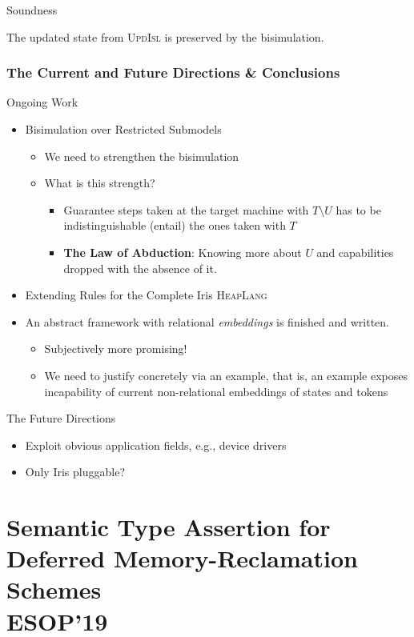 \documentclass[aspectratio=169,xcolor=dvipsnames]{beamer}
\newcommand{\makepart}[1]{ %
\part{#1} \frame{\partpage}
}
\begin{document}
\begin{frame}{Soundness}
\begin{theorem}[Soundness]
    The updated state from \textsc{UpdIsl} is preserved by the bisimulation.
\end{theorem}
\end{frame}


\section{The Current and Future Directions \& Conclusions}
\begin{frame}{Ongoing Work}
    \begin{itemize}
        \item Bisimulation over Restricted Submodels
        \begin{itemize}
            \item We need to  strengthen the bisimulation 
            \item What is this strength? 
            \begin{itemize}
                \item Guarantee steps taken at the target machine with $T\setminus U$ has to be indistinguishable (entail) the ones taken with $T$
                \item \textbf{The Law of Abduction}: Knowing more about $U$ and capabilities dropped with the absence of it.

            \end{itemize}
            
        \end{itemize}
        \item Extending Rules for the Complete Iris \textsc{HeapLang}
                        \item  An abstract framework with relational \emph{embeddings} is finished and written. 
                        \begin{itemize}
                            \item Subjectively more promising!
                            \item We need to justify concretely via an example, that is, an example exposes incapability of current non-relational embeddings of states and tokens \end{itemize}
                        \end{itemize}
\end{frame}
\begin{frame}{The Future Directions}
    \begin{itemize}
        \item Exploit obvious application fields, e.g., device drivers
        \item Only Iris pluggable?
    \end{itemize}
\end{frame}
\makepart{Semantic Type Assertion for Deferred Memory-Reclamation Schemes \\ ESOP'19}
\end{document}
